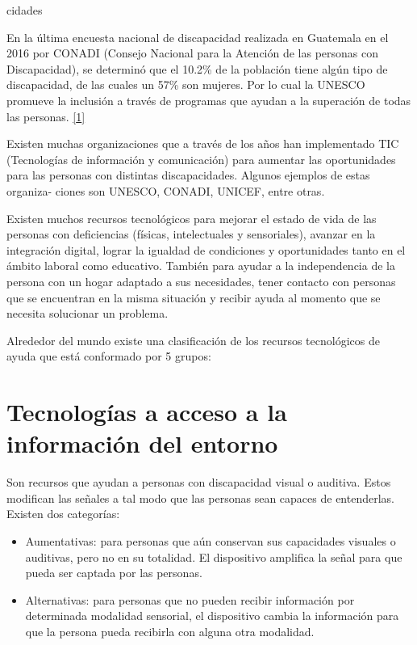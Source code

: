 \documentclass[12pt,spanish,Letterpaper,openany]{book}
\begin{document}
cidades

\hypertarget{articulo05_cross01}{}

En la última encuesta nacional de discapacidad realizada en Guatemala en el 2016 por CONADI (Consejo Nacional para la Atención de las personas con Discapacidad), se determinó que el 10.2\% de la población tiene algún tipo de discapacidad, de las cuales un 57\% son mujeres. Por lo cual la UNESCO promueve la inclusión a través de programas que ayudan a la superación de todas las personas. \protect\hyperlink{articulo05_ref01}{{[}1{]}}

Existen muchas organizaciones que a través de los años han implementado TIC (Tecnologías de información y comunicación) para aumentar las oportunidades para las personas con distintas discapacidades. Algunos ejemplos de estas organiza-
ciones son UNESCO, CONADI, UNICEF, entre otras.

Existen muchos recursos tecnológicos para mejorar el estado de vida de las personas con deficiencias (físicas, intelectuales y sensoriales), avanzar en la integración digital, lograr la igualdad de condiciones y oportunidades tanto en el ámbito laboral como educativo. También para ayudar a la independencia de la persona con un hogar adaptado a sus necesidades, tener contacto con personas que se encuentran en la misma situación y recibir ayuda al momento que se necesita solucionar un problema.

Alrededor del mundo existe una clasificación de los recursos tecnológicos de ayuda que está conformado por 5 grupos:

\hypertarget{tecnologuxedas-a-acceso-a-la-informaciuxf3n-del-entorno}{%
\section{Tecnologías a acceso a la información del entorno}\label{tecnologuxedas-a-acceso-a-la-informaciuxf3n-del-entorno}}

Son recursos que ayudan a personas con discapacidad visual o auditiva. Estos modifican las señales a tal modo que las personas sean capaces de entenderlas. Existen dos categorías:

\begin{itemize}
\item
  Aumentativas: para personas que aún conservan sus capacidades visuales o auditivas, pero no en su totalidad. El dispositivo amplifica la señal para que pueda ser captada por las personas.
\item
  Alternativas: para personas que no pueden recibir información por determinada modalidad sensorial, el dispositivo cambia la información para que la persona pueda recibirla con alguna otra modalidad.
\end{itemize}
\end{document}
